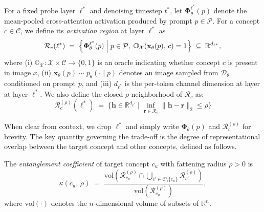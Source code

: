 For a fixed probe layer $\ell^*$ and denoising timestep $t^*$, let $\boldsymbol{\Phi}^{\ell^*}_\theta(p)$ denote the mean-pooled cross-attention activation produced by prompt $p \in \mathcal{P}$. 
For a concept $c \in \mathcal{C}$, we define its \emph{activation region} at layer $\ell^*$ as
\begin{equation}
    \mathcal{R}_c (\ell^*)
    \;=\;
    \Bigl\{
        \boldsymbol{\Phi}^{\ell^*}_\theta(p)
        \;\Big|\;
        p \in \mathcal{P},\;
        \mathbb{O}_{\mathcal{X}}\!\left(\mathbf{x}_{\theta}(p),\, c\right) = 1
    \Bigr\}
    \;\subseteq\; \mathbb{R}^{d_{\ell^*}},
\end{equation}
where (i) $\mathbb{O}_{\mathcal{X}} : \mathcal{X} \times \mathcal{C} \to \{0,1\}$ is an oracle indicating whether concept $c$ is present in image $x$, (ii) $\mathbf{x}_{\theta}(p) \sim p_{\theta}(\cdot \mid p)$ denotes an image sampled from $\mathcal{D}_\theta$ conditioned on prompt $p$, and (iii) $d_{\ell^*}$ is the per-token channel dimension at layer at layer $\ell^*$.
We also define the closed $\rho$-neighborhood of $\mathcal{R}_c$ as:
\begin{equation}
    \mathcal{R}_c^{(\rho)} (\ell^*)
    \;=\;
    \bigl\{\mathbf{h} \in \mathbb{R}^{d_{\ell^*}} \;\big|\;
    \inf_{\mathbf{r}  \in \mathcal{R}_c}\|\mathbf{h} - \mathbf{r}\|_2 \leq \rho\bigr\}
\end{equation}

When clear from context, we drop $\ell^*$ and simply write $\boldsymbol{\Phi}_\theta(p)$ and $\mathcal{R}_c^{(\rho)}$ for brevity.
The key quantity governing the trade-off is the degree of representational overlap between the target concept and other concepts, defined as follows. 


\begin{definition}
\label{def:overlap}
The \emph{entanglement coefficient} of target concept $c_u$ with fattening radius $\rho > 0$ is
\[
    \kappa(c_u,\,\rho)
    \;=\;
    \frac{
        \mathrm{vol}\!\left(
            \mathcal{R}_{c_u}^{(\rho)}
            \cap
            \bigcup_{c' \in \mathcal{C} \setminus \{c_u\}} \mathcal{R}_{c'}^{(\rho)}
        \right)
    }{
        \mathrm{vol}\!\left(\mathcal{R}_{c_u}^{(\rho)}\right)
    },
\]
where $\mathrm{vol}(\cdot)$ denotes the $n$-dimensional volume of subsets of $\mathbb{R}^n$.
\end{definition}

